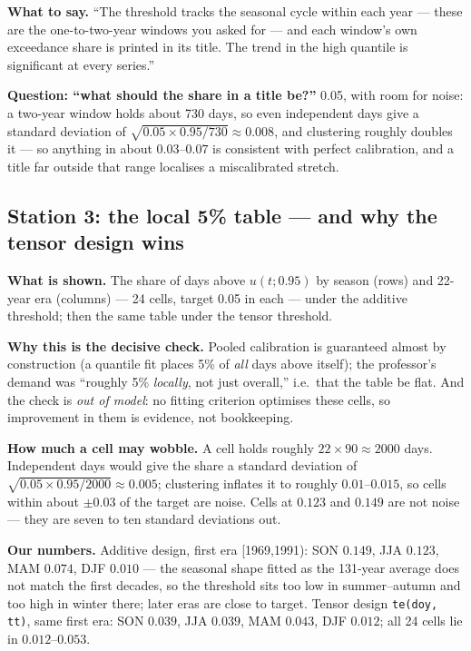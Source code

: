 \documentclass[11pt]{article}
\newcommand{\code}[1]{\texttt{#1}}
\begin{document}
\textbf{What to say.} ``The threshold tracks the seasonal cycle within each
year --- these are the one-to-two-year windows you asked for --- and each
window's own exceedance share is printed in its title. The trend in the high
quantile is significant at every series.''

\textbf{Question: ``what should the share in a title be?''} 0.05, with room
for noise: a two-year window holds about 730 days, so even independent days
give a standard deviation of $\sqrt{0.05 \times 0.95 / 730} \approx 0.008$,
and clustering roughly doubles it --- so anything in about $0.03$--$0.07$ is
consistent with perfect calibration, and a title far outside that range
localises a miscalibrated stretch.

\subsection{Station 3: the local 5\% table --- and why the tensor design wins}
\label{sec:local5}

\textbf{What is shown.} The share of days above $u(t;0.95)$ by season (rows)
and 22-year era (columns) --- 24 cells, target 0.05 in each --- under the
additive threshold; then the same table under the tensor threshold.

\textbf{Why this is the decisive check.} Pooled calibration is guaranteed
almost by construction (a quantile fit places 5\% of \emph{all} days above
itself); the professor's demand was ``roughly 5\% \emph{locally}, not just
overall,'' i.e.\ that the table be flat. And the check is \emph{out of
model}: no fitting criterion optimises these cells, so improvement in them is
evidence, not bookkeeping.

\textbf{How much a cell may wobble.} A cell holds roughly
$22 \times 90 \approx 2000$ days. Independent days would give the share a
standard deviation of $\sqrt{0.05 \times 0.95/2000} \approx 0.005$;
clustering inflates it to roughly $0.01$--$0.015$, so cells within about
$\pm 0.03$ of the target are noise. Cells at $0.123$ and $0.149$ are not
noise --- they are seven to ten standard deviations out.

\textbf{Our numbers.} Additive design, first era [1969,1991): SON $0.149$,
JJA $0.123$, MAM $0.074$, DJF $0.010$ --- the seasonal shape fitted as the
131-year average does not match the first decades, so the threshold sits too
low in summer--autumn and too high in winter there; later eras are close to
target. Tensor design \code{te(doy, tt)}, same first era: SON $0.039$, JJA
$0.039$, MAM $0.043$, DJF $0.012$; all 24 cells lie in $0.012$--$0.053$.
\end{document}
